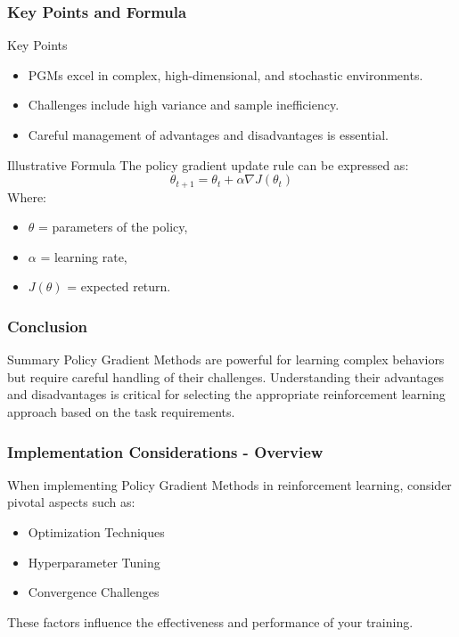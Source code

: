 \documentclass[aspectratio=169]{beamer}
\begin{document}
\begin{frame}[fragile]
    \frametitle{Key Points and Formula}
    \begin{block}{Key Points}
        \begin{itemize}
            \item PGMs excel in complex, high-dimensional, and stochastic environments.
            \item Challenges include high variance and sample inefficiency.
            \item Careful management of advantages and disadvantages is essential.
        \end{itemize}
    \end{block}

    \begin{block}{Illustrative Formula}
        The policy gradient update rule can be expressed as:
        \begin{equation}
            \theta_{t+1} = \theta_t + \alpha \nabla J(\theta_t)
        \end{equation}
        Where:
        \begin{itemize}
            \item \(\theta\) = parameters of the policy,
            \item \(\alpha\) = learning rate,
            \item \(J(\theta)\) = expected return.
        \end{itemize}
    \end{block}
\end{frame}

\begin{frame}[fragile]
    \frametitle{Conclusion}
    \begin{block}{Summary}
        Policy Gradient Methods are powerful for learning complex behaviors but require careful handling of their challenges. 
        Understanding their advantages and disadvantages is critical for selecting the appropriate reinforcement learning approach based on the task requirements.
    \end{block}
\end{frame}

\begin{frame}[fragile]
    \frametitle{Implementation Considerations - Overview}
    When implementing Policy Gradient Methods in reinforcement learning, consider pivotal aspects such as:
    \begin{itemize}
        \item Optimization Techniques
        \item Hyperparameter Tuning
        \item Convergence Challenges
    \end{itemize}
    These factors influence the effectiveness and performance of your training.
\end{frame}
\end{document}
